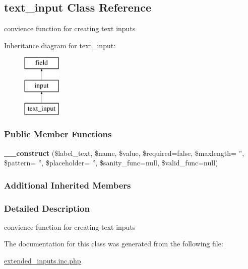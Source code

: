 \hypertarget{classtext__input}{\subsection{text\-\_\-input Class Reference}
\label{classtext__input}
}


convience function for creating text inputs  


Inheritance diagram for text\-\_\-input\-:\begin{figure}[H]
\begin{center}
\leavevmode
\includegraphics[height=3.000000cm]{classtext__input}
\end{center}
\end{figure}
\subsubsection*{Public Member Functions}
\begin{DoxyCompactItemize}
\item 
\hypertarget{classtext__input_a5099af7bcf7d4cb5ad348e5662ed9de4}{{\bfseries \-\_\-\-\_\-construct} (\$label\-\_\-text, \$name, \$value, \$required=false, \$maxlength= '', \$pattern= '', \$placeholder= '', \$sanity\-\_\-func=null, \$valid\-\_\-func=null)}\label{classtext__input_a5099af7bcf7d4cb5ad348e5662ed9de4}

\end{DoxyCompactItemize}
\subsubsection*{Additional Inherited Members}


\subsubsection{Detailed Description}
convience function for creating text inputs 



The documentation for this class was generated from the following file\-:\begin{DoxyCompactItemize}
\item 
\hyperlink{extended__inputs_8inc_8php}{extended\-\_\-inputs.\-inc.\-php}\end{DoxyCompactItemize}
